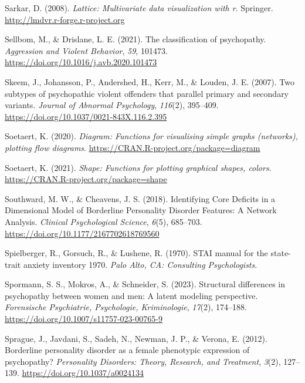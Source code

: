 \documentclass[
  man,floatsintext]{apa7}
\newlength{\cslhangindent}
\newlength{\cslentryspacingunit} %
\newenvironment{CSLReferences}[2] %
 {%
  \setlength{\parindent}{0pt}
  \ifodd #1
  \let\oldpar\par
  \def\par{\hangindent=\cslhangindent\oldpar}
  \fi
  \setlength{\parskip}{#2\cslentryspacingunit}
 }%
 {}
\begin{document}
\begin{CSLReferences}{1}{0}
\leavevmode{}%
Sarkar, D. (2008). \emph{Lattice: Multivariate data visualization with r}. Springer. \url{http://lmdvr.r-forge.r-project.org}

\leavevmode{}%
Sellbom, M., \& Drislane, L. E. (2021). The classification of psychopathy. \emph{Aggression and Violent Behavior}, \emph{59}, 101473. \url{https://doi.org/10.1016/j.avb.2020.101473}

\leavevmode{}%
Skeem, J., Johansson, P., Andershed, H., Kerr, M., \& Louden, J. E. (2007). Two subtypes of psychopathic violent offenders that parallel primary and secondary variants. \emph{Journal of Abnormal Psychology}, \emph{116}(2), 395--409. \url{https://doi.org/10.1037/0021-843X.116.2.395}

\leavevmode{}%
Soetaert, K. (2020). \emph{Diagram: Functions for visualising simple graphs (networks), plotting flow diagrams}. \url{https://CRAN.R-project.org/package=diagram}

\leavevmode{}%
Soetaert, K. (2021). \emph{Shape: Functions for plotting graphical shapes, colors}. \url{https://CRAN.R-project.org/package=shape}

\leavevmode{}%
Southward, M. W., \& Cheavens, J. S. (2018). Identifying {Core Deficits} in a {Dimensional Model} of {Borderline Personality Disorder Features}: {A Network Analysis}. \emph{Clinical Psychological Science}, \emph{6}(5), 685--703. \url{https://doi.org/10.1177/2167702618769560}

\leavevmode{}%
Spielberger, R., Gorsuch, R., \& Lushene, R. (1970). STAI manual for the state-trait anxiety inventory 1970. \emph{Palo Alto, CA: Consulting Psychologists}.

\leavevmode{}%
Spormann, S. S., Mokros, A., \& Schneider, S. (2023). Structural differences in psychopathy between women and men: A latent modeling perspective. \emph{Forensische Psychiatrie, Psychologie, Kriminologie}, \emph{17}(2), 174--188. \url{https://doi.org/10.1007/s11757-023-00765-9}

\leavevmode{}%
Sprague, J., Javdani, S., Sadeh, N., Newman, J. P., \& Verona, E. (2012). Borderline personality disorder as a female phenotypic expression of psychopathy? \emph{Personality Disorders: Theory, Research, and Treatment}, \emph{3}(2), 127--139. \url{https://doi.org/10.1037/a0024134}


\end{CSLReferences}
\end{document}
